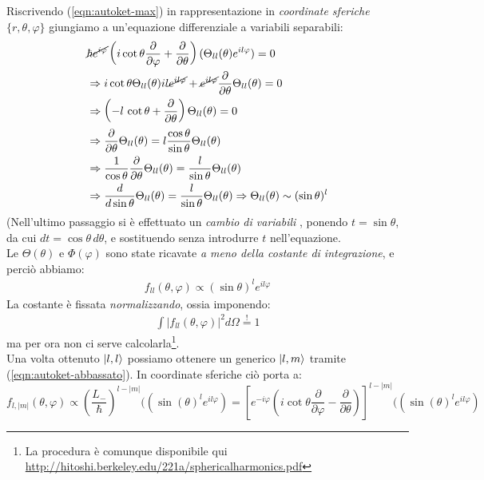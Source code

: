\documentclass[../../FisicaTeorica.tex]{subfiles}
\begin{document}
Riscrivendo (\ref{eqn:autoket-max}) in rappresentazione in \textit{coordinate sferiche} $\{r,\theta,\varphi\}$ giungiamo a un'equazione differenziale a variabili separabili: 
\begin{align*}
&\cancel{\hbar e^{i\varphi}}\left(i\cot \theta \frac{\partial}{\partial \varphi}+\frac{\partial}{\partial \theta}\right) (\Theta_{ll}(\theta)e^{il\varphi})=0\\
&\Rightarrow i\cot \theta \Theta_{ll}(\theta) il \cancel{e^{il\varphi} }+ \cancel{e^{il\varphi}}\frac{\partial}{\partial \theta} \Theta_{ll}(\theta) =0 \\
&\Rightarrow \left(-l\,\cot\theta  + \frac{\partial}{\partial \theta}\right)\Theta_{ll}(\theta)=0\\
&\Rightarrow \frac{\partial}{\partial \theta} \Theta_{ll}(\theta) = l\frac{\cos\theta}{\sin\theta} \Theta_{ll}(\theta)\\
&\Rightarrow \frac{1}{\cos\theta}\frac{\partial}{\partial \theta} \Theta_{ll}(\theta)=\frac{l}{\sin\theta}\Theta_{ll}(\theta)\\
&\Rightarrow \frac{d}{d\sin\theta}\Theta_{ll}(\theta)=\frac{l}{\sin\theta}\Theta_{ll}(\theta)\Rightarrow \Theta_{ll}(\theta) \sim (\sin\theta)^l
\end{align*}
(Nell'ultimo passaggio si è effettuato un \textit{cambio di variabili} , ponendo $t=\sin\theta$, da cui $dt = \cos\theta \,d\theta$, e sostituendo senza introdurre $t$ nell'equazione.\\
Le $\Theta(\theta)$ e $\Phi(\varphi)$ sono state ricavate \textit{a meno della costante di integrazione}, e perciò abbiamo:
\begin{align*}
f_{ll}(\theta,\varphi) \propto (\sin\theta)^l e^{il\varphi}
\end{align*}
La costante è fissata \textit{normalizzando}, ossia imponendo:
\begin{align*}
\int |f_{ll}(\theta,\varphi)|^2 d\Omega \overset{!}{=}1
\end{align*}
ma per ora non ci serve calcolarla\footnote{La procedura è comunque disponibile qui \url{http://hitoshi.berkeley.edu/221a/sphericalharmonics.pdf}}.\\
Una volta ottenuto $\ket{l,l}$ possiamo ottenere un generico $\ket{l,m}$  tramite (\ref{eqn:autoket-abbassato}). In coordinate sferiche ciò porta a:
\[
f_{l,|m|}(\theta,\varphi) \propto \left(\frac{L_-}{\hbar}\right)^{l-|m|}((\sin(\theta)^l e^{il\varphi}) = \left[e^{-i\varphi}\left( i \cot\theta\frac{\partial}{\partial \varphi}-\frac{\partial}{\partial \theta}\right)\right]^{l-|m|}((\sin(\theta)^l e^{il\varphi})
\]
\end{document}
